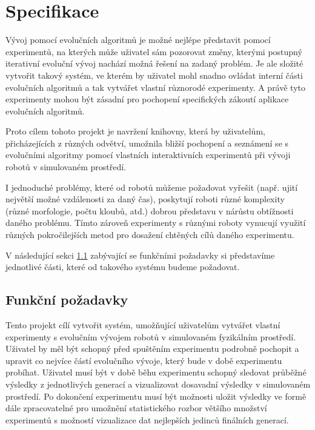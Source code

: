 \chapter{Specifikace}

Vývoj pomocí evolučních algoritmů je možné nejlépe představit pomocí
experimentů, na kterých může uživatel sám pozorovat změny, kterými postupný
iterativní evoluční vývoj nachází možná řešení na zadaný problém. Je ale
složité vytvořit takový systém, ve kterém by uživatel mohl snadno ovládat
interní části evolučních algoritmů a tak vytvářet vlastní různorodé
experimenty. A právě tyto experimenty mohou být zásadní pro pochopení
specifických zákoutí aplikace evolučních algoritmů.

Proto cílem tohoto projekt je navržení knihovny, která by uživatelům,
přicházejících z různých odvětví, umožnila bližší pochopení a seznámení se s
evolučními algoritmy pomocí vlastních interaktivních experimentů při vývoji
robotů v simulovaném prostředí. 

I jednoduché problémy, které od robotů můžeme požadovat vyřešit (např. ujití
největší možné vzdálenosti za daný čas), poskytují roboti různé komplexity
(různé morfologie, počtu kloubů, atd.) dobrou představu v nárůstu obtížnosti
daného problému. Tímto zároveň experimenty s různými roboty vynucují využití
různých pokročilejších metod pro dosažení chtěných cílů daného experimentu.

V následující sekci \ref{Specifikace-funkčnípožadavky} zabývající se funkčními
požadavky si představíme jednotlivé části, které od takového systému budeme
požadovat.

\section{Funkční požadavky} \label{Specifikace-funkčnípožadavky}

Tento projekt cílí vytvořit systém, umožňující uživatelům vytvářet vlastní
experimenty s evolučním vývojem robotů v simulovaném fyzikálním prostředí.
Uživatel by měl být schopný před spuštěním experimentu podrobně pochopit a
upravit co nejvíce částí evolučního vývoje, který bude v době experimentu
probíhat. Uživatel musí být v době běhu experimentu schopný sledovat průběžné
výsledky z jednotlivých generací a vizualizovat dosavadní výsledky v
simulovaném prostředí. Po dokončení experimentu musí být možnosti uložit
výsledky ve formě dále zpracovatelné pro umožnění statistického rozbor většího
množství experimentů s možností vizualizace dat nejlepších jedinců finálních
generací.

